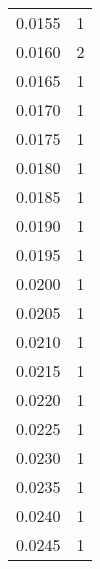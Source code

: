 \begin{tabular}{rr}
           0.0155 &                    1 \\
           0.0160 &                    2 \\
           0.0165 &                    1 \\
           0.0170 &                    1 \\
           0.0175 &                    1 \\
           0.0180 &                    1 \\
           0.0185 &                    1 \\
           0.0190 &                    1 \\
           0.0195 &                    1 \\
           0.0200 &                    1 \\
           0.0205 &                    1 \\
           0.0210 &                    1 \\
           0.0215 &                    1 \\
           0.0220 &                    1 \\
           0.0225 &                    1 \\
           0.0230 &                    1 \\
           0.0235 &                    1 \\
           0.0240 &                    1 \\
           0.0245 &                    1 \\
\bottomrule
\end{tabular}
